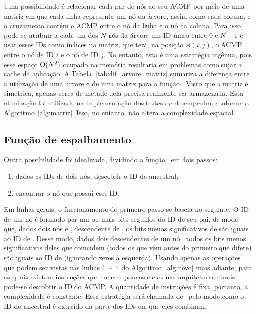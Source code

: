 Uma possibilidade é relacionar cada par de nós ao seu ACMP por meio de uma matriz
em que cada linha representa um nó da árvore, assim como cada coluna, e o cruzamento contém o ACMP entre o nó da linha e o nó da coluna.
Para isso, pode-se atribuir a cada um dos $N$ nós da árvore um ID único entre $0$ e $N-1$ e usar esses IDs como índices na matriz,
que terá, na posição $A(i,j)$, o ACMP entre o nó de ID $i$ e o nó de ID $j$.
No entanto, esta é uma estratégia ingênua, pois esse espaço $\operatorname{O}(N^2)$ ocupado na memória resultaria em problemas como sujar a cache da aplicação.
A Tabela~\ref{tab:dif_arvore_matriz} sumariza a diferença entre a utilização de uma árvore e de uma matriz para a função \fACMP.
Visto que a matriz é simétrica, apenas cerca de metade dela precisa realmente ser armazenada.
Esta otimização foi utilizada na implementação dos testes de desempenho, conforme o Algoritmo~\ref{alg:matriz}.
Isso, no entanto, não altera a complexidade espacial.





\subsection{Função de espalhamento}

Outra possibilidade foi idealizada, dividindo a função \ACMPIDs\ em dois passos:
\begin{enumerate}
	\item dados os IDs de dois nós, descobrir o ID do ancestral;
	\item encontrar o nó que possui esse ID.
\end{enumerate}
Em linhas gerais, o funcionamento do primeiro passo se baseia no seguinte:
O ID de um nó é formado por um ou mais bits seguidos do ID do seu pai, de modo que, dados dois nós  e ,  descendente de ,
os bits menos significativos de  são iguais ao ID de .
Desse modo, dados dois descendentes de um nó , todos os bits menos significativos deles que coincidem
(todos os que vêm antes do primeiro que difere) são iguais ao ID de  (ignorando zeros à esquerda).
Usando apenas as operações que podem ser vistas nas linhas 1~--~4 do Algoritmo~\ref{alg:novo} mais adiante,
para as quais existem instruções que tomam poucos ciclos nas arquiteturas atuais, pode-se descobrir o ID do ACMP.
A quantidade de instruções é fixa, portanto, a complexidade é constante.
Essa estratégia será chamada de \Novo\ pelo modo como o ID do ancestral é extraído da parte dos IDs em que eles combinam.

